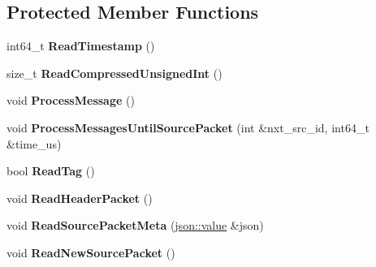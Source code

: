 \subsection*{Protected Member Functions}
\begin{DoxyCompactItemize}
\item 
int64\+\_\+t {\bfseries Read\+Timestamp} ()\hypertarget{classpangolin_1_1_packet_stream_reader_aadca1f14ec7e421831e3b0a4b34c1f45}{}\label{classpangolin_1_1_packet_stream_reader_aadca1f14ec7e421831e3b0a4b34c1f45}

\item 
size\+\_\+t {\bfseries Read\+Compressed\+Unsigned\+Int} ()\hypertarget{classpangolin_1_1_packet_stream_reader_ac594ef5afa759ce58b3ae2a2fc0a3420}{}\label{classpangolin_1_1_packet_stream_reader_ac594ef5afa759ce58b3ae2a2fc0a3420}

\item 
void {\bfseries Process\+Message} ()\hypertarget{classpangolin_1_1_packet_stream_reader_a090d547ec84af0003dfe5d43f2f01e9f}{}\label{classpangolin_1_1_packet_stream_reader_a090d547ec84af0003dfe5d43f2f01e9f}

\item 
void {\bfseries Process\+Messages\+Until\+Source\+Packet} (int \&nxt\+\_\+src\+\_\+id, int64\+\_\+t \&time\+\_\+us)\hypertarget{classpangolin_1_1_packet_stream_reader_a421f6924b19826ac412822d2d54f56e6}{}\label{classpangolin_1_1_packet_stream_reader_a421f6924b19826ac412822d2d54f56e6}

\item 
bool {\bfseries Read\+Tag} ()\hypertarget{classpangolin_1_1_packet_stream_reader_acc53cd09b91d94629c44c189f42b942e}{}\label{classpangolin_1_1_packet_stream_reader_acc53cd09b91d94629c44c189f42b942e}

\item 
void {\bfseries Read\+Header\+Packet} ()\hypertarget{classpangolin_1_1_packet_stream_reader_aa7756bbe7d074c8fc6ff18124f069d8a}{}\label{classpangolin_1_1_packet_stream_reader_aa7756bbe7d074c8fc6ff18124f069d8a}

\item 
void {\bfseries Read\+Source\+Packet\+Meta} (\hyperlink{classpangolin_1_1json_1_1value}{json\+::value} \&json)\hypertarget{classpangolin_1_1_packet_stream_reader_a3ba94740c0f9a43e1e2750f5271536bd}{}\label{classpangolin_1_1_packet_stream_reader_a3ba94740c0f9a43e1e2750f5271536bd}

\item 
void {\bfseries Read\+New\+Source\+Packet} ()\hypertarget{classpangolin_1_1_packet_stream_reader_a84ec5d9535eea4a0fabedb00fa15140e}{}\label{classpangolin_1_1_packet_stream_reader_a84ec5d9535eea4a0fabedb00fa15140e}


\end{DoxyCompactItemize}
